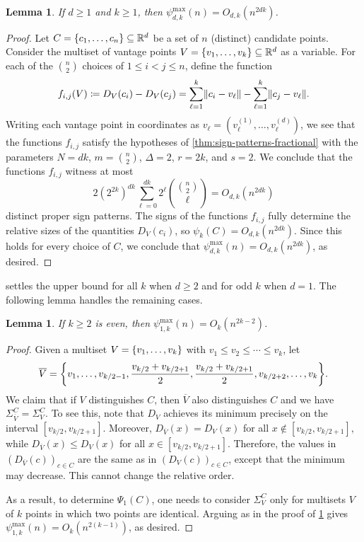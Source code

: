 \documentclass[11pt]{amsart}
\newtheorem{lemma}[theorem]{Lemma}
\theoremstyle{definition}
\DeclarePairedDelimiter{\set}{\{}{\}}
\DeclarePairedDelimiter{\Abs}{\lVert}{\rVert}
\newcommand{\perm}{\psi^{\mathrm{max}}}
\newcommand{\RR}{\mathbb{R}}
\begin{document}
\begin{lemma}\label{lem:main-upper}
If $d \geq 1$ and $k \geq 1$, then $\perm_{d,k}(n)=O_{d,k}(n^{2dk})$.
\end{lemma}

\begin{proof}
Let $C=\set{c_1, \ldots, c_n}\subseteq \RR^d$ be a set of $n$ (distinct) candidate points.  Consider the multiset of vantage points $V=\set{v_1, \ldots, v_k} \subseteq \RR^d$ as a variable.  For each of the $\binom{n}{2}$ choices of $1 \leq i<j \leq n$, define the function
\[f_{i,j}(V)\coloneqq D_V(c_i)-D_V(c_j)=\sum_{\ell=1}^k \Abs{c_i-v_\ell}-\sum_{\ell=1}^k \Abs{c_j-v_\ell}.\]
Writing each vantage point in coordinates as $v_\ell=(v_\ell^{(1)},\ldots, v_\ell^{(d)})$, we see that the functions $f_{i,j}$ satisfy the hypotheses of \cref{thm:sign-patterns-fractional} with the parameters $N=dk$, $m=\binom{n}{2}$, $\Delta=2$, $r=2k$, and $s=2$.  We conclude that the functions $f_{i,j}$ witness at most
\[2(2^{2k})^{dk} \sum_{\ell=0}^{dk} 2^\ell \binom{\binom{n}{2}}{\ell}=O_{d,k}(n^{2dk})\]
distinct proper sign patterns.  The signs of the functions $f_{i,j}$ fully determine the relative sizes of the quantities $D_V(c_i)$, so $\psi_k(C)=O_{d,k}(n^{2dk})$.  Since this holds for every choice of $C$, we conclude that $\perm_{d,k}(n)=O_{d,k}(n^{2dk})$, as desired.
\end{proof}

 settles the upper bound for all $k$ when $d \geq 2$ and for odd $k$ when $d = 1$.  The following lemma handles the remaining cases.
\begin{lemma}
If $k \geq 2$ is even, then $\perm_{1,k}(n)=O_{k}(n^{2k-2})$.
\end{lemma}
\begin{proof}
Given a multiset $V = \set{v_1,\ldots,v_k}$ with $v_1 \leq v_2 \leq \cdots \leq v_k$, let \[\overline V = \set*{v_1,\ldots,v_{k/2-1},\frac{v_{k/2}+v_{k/2+1}}{2},\frac{v_{k/2}+v_{k/2+1}}{2},v_{k/2+2},\ldots,v_k}.\] We claim that if $V$ distinguishes $C$, then $\overline V$ also distinguishes $C$ and we have  $\Sigma^C_{\overline V} = \Sigma^C_V$. To see this, note that $D_V$ achieves its minimum precisely on the interval $[v_{k/2}, v_{k/2+1}]$. Moreover, $D_{\overline V}(x) = D_V(x)$ for all $x \notin [v_{k/2},v_{k/2+1}]$, while $D_{\overline V}(x) \leq D_V(x)$ for all $x \in [v_{k/2},v_{k/2+1}]$. Therefore, the values in $(D_{\overline V}(c))_{c \in C}$ are the same as in $(D_V(c))_{c \in C}$, except that the minimum may decrease. This cannot change the relative order.

As a result, to determine $\Psi_1(C)$, one needs to consider $\Sigma^C_V$ only for multisets $V$ of $k$ points in which two points are identical. Arguing as in the proof of \cref{lem:main-upper} gives $\perm_{1,k}(n) = O_k(n^{2(k-1)})$, as desired.
\end{proof}
\end{document}
